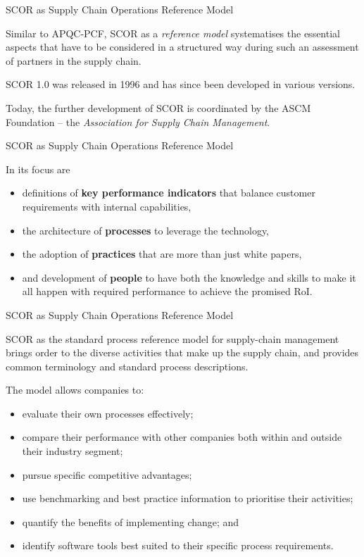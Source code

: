 \documentclass{beamer}
\begin{document}
\begin{frame}{SCOR as Supply Chain Operations Reference Model}

Similar to APQC-PCF, SCOR as a \emph{reference model} systematises the
essential aspects that have to be considered in a structured way during such
an assessment of partners in the supply chain.

SCOR 1.0 was released in 1996 and has since been developed in various
versions.

Today, the further development of SCOR is coordinated by the ASCM Foundation
-- the \emph{Association for Supply Chain Management}.
  
\end{frame}

\begin{frame}{SCOR as Supply Chain Operations Reference Model}

In its focus are 
\begin{itemize}
\item definitions of \textbf{key performance indicators} that balance
  customer requirements with internal capabilities,
\item the architecture of \textbf{processes} to leverage the technology,
\item the adoption of \textbf{practices} that are more than just white papers,
\item and development of \textbf{people} to have both the knowledge and skills
  to make it all happen with required performance to achieve the promised RoI.
\end{itemize}
\end{frame}

\begin{frame}{SCOR as Supply Chain Operations Reference Model}

SCOR as the standard process reference model for supply-chain management
brings order to the diverse activities that make up the supply chain, and
provides common terminology and standard process descriptions.

The model allows companies to:
\begin{itemize}
\item evaluate their own processes effectively;
\item compare their performance with other companies both within and outside
  their industry segment;
\item pursue specific competitive advantages;
\item use benchmarking and best practice information to prioritise their
  activities;
\item quantify the benefits of implementing change; and
\item identify software tools best suited to their specific process
  requirements.
\end{itemize}

\end{frame}
\end{document}

